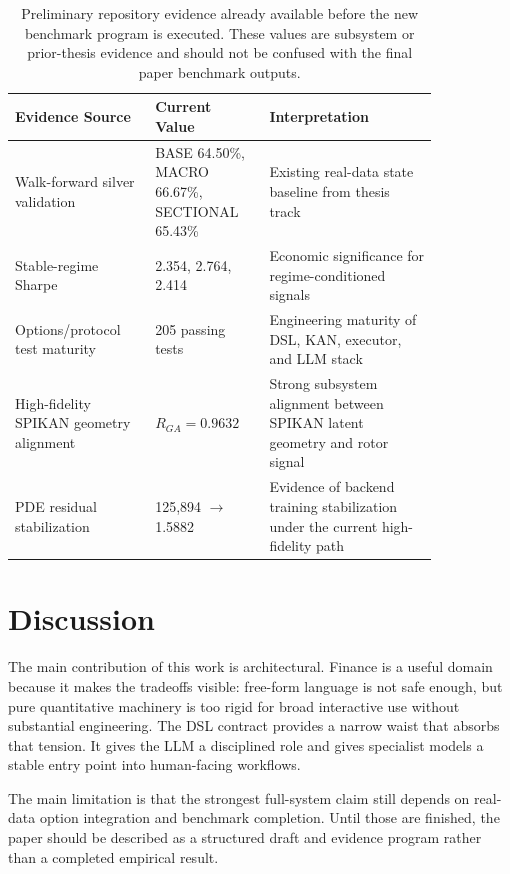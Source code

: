 \documentclass[11pt]{article}
\begin{document}
\begin{table}[H]
  \centering
  \caption{Preliminary repository evidence already available before the new
  benchmark program is executed. These values are subsystem or prior-thesis
  evidence and should not be confused with the final paper benchmark outputs.}
  \label{tab:preliminary-evidence}
  \begin{tabular}{p{0.28\linewidth} p{0.22\linewidth} p{0.34\linewidth}}
    \toprule
    Evidence Source & Current Value & Interpretation \\
    \midrule
    Walk-forward silver validation & BASE 64.50\%, MACRO 66.67\%, SECTIONAL 65.43\% & Existing real-data state baseline from thesis track \\
    Stable-regime Sharpe & 2.354, 2.764, 2.414 & Economic significance for regime-conditioned signals \\
    Options/protocol test maturity & 205 passing tests & Engineering maturity of DSL, KAN, executor, and LLM stack \\
    High-fidelity SPIKAN geometry alignment & $R_{GA}=0.9632$ & Strong subsystem alignment between SPIKAN latent geometry and rotor signal \\
    PDE residual stabilization & 125{,}894 $\rightarrow$ 1.5882 & Evidence of backend training stabilization under the current high-fidelity path \\
    \bottomrule
  \end{tabular}
\end{table}

\section{Discussion}

The main contribution of this work is architectural. Finance is a useful domain
because it makes the tradeoffs visible: free-form language is not safe enough,
but pure quantitative machinery is too rigid for broad interactive use without
substantial engineering. The DSL contract provides a narrow waist that absorbs
that tension. It gives the LLM a disciplined role and gives specialist models a
stable entry point into human-facing workflows.

The main limitation is that the strongest full-system claim still depends on
real-data option integration and benchmark completion. Until those are finished,
the paper should be described as a structured draft and evidence program rather
than a completed empirical result.
\end{document}
